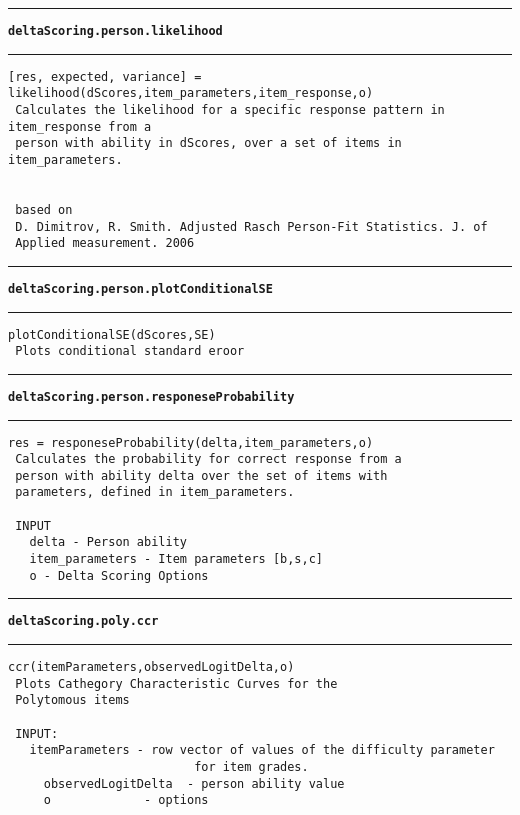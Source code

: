\par\noindent\rule{\textwidth}{0.4pt}
{\bf\tt deltaScoring.person.likelihood}
\par\noindent\rule{\textwidth}{0.4pt}
\begin{lstlisting}[style=Matlab-bw]
 [res, expected, variance] = likelihood(dScores,item_parameters,item_response,o)
 Calculates the likelihood for a specific response pattern in item_response from a
 person with ability in dScores, over a set of items in item_parameters.


 based on
 D. Dimitrov, R. Smith. Adjusted Rasch Person-Fit Statistics. J. of
 Applied measurement. 2006

\end{lstlisting}
\par\noindent\rule{\textwidth}{0.4pt}
{\bf\tt deltaScoring.person.plotConditionalSE}
\par\noindent\rule{\textwidth}{0.4pt}
\begin{lstlisting}[style=Matlab-bw]
 plotConditionalSE(dScores,SE)
 Plots conditional standard eroor
\end{lstlisting}
\par\noindent\rule{\textwidth}{0.4pt}
{\bf\tt deltaScoring.person.responeseProbability}
\par\noindent\rule{\textwidth}{0.4pt}
\begin{lstlisting}[style=Matlab-bw]
 res = responeseProbability(delta,item_parameters,o)
 Calculates the probability for correct response from a
 person with ability delta over the set of items with
 parameters, defined in item_parameters.

 INPUT
   delta - Person ability
   item_parameters - Item parameters [b,s,c]
   o - Delta Scoring Options
\end{lstlisting}
\par\noindent\rule{\textwidth}{0.4pt}
{\bf\tt deltaScoring.poly.ccr}
\par\noindent\rule{\textwidth}{0.4pt}
\begin{lstlisting}[style=Matlab-bw]
 ccr(itemParameters,observedLogitDelta,o)
 Plots Cathegory Characteristic Curves for the
 Polytomous items

 INPUT:
   itemParameters - row vector of values of the difficulty parameter
                          for item grades.
	 observedLogitDelta  - person ability value
	 o             - options

\end{lstlisting}
